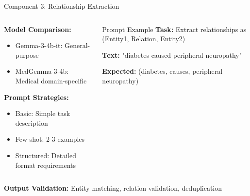 \documentclass[aspectratio=169, 11pt]{beamer}
\begin{document}
\begin{frame}{Component 3: Relationship Extraction}
    \begin{columns}
        \begin{column}{0.5\textwidth}
            \textbf{Model Comparison:}
            \begin{itemize}
                \item \textcolor{ulblue}{Gemma-3-4b-it}: General-purpose
                \item \textcolor{ulgreen}{MedGemma-3-4b}: Medical domain-specific
            \end{itemize}
            
            \textbf{Prompt Strategies:}
            \begin{itemize}
                \item Basic: Simple task description
                \item Few-shot: 2-3 examples
                \item Structured: Detailed format requirements
            \end{itemize}
        \end{column}
        \begin{column}{0.5\textwidth}
            \begin{exampleblock}{Prompt Example}
                \footnotesize
                \textbf{Task:} Extract relationships as (Entity1, Relation, Entity2)
                
                \textbf{Text:} "diabetes caused peripheral neuropathy"
                
                \textbf{Expected:} (diabetes, causes, peripheral neuropathy)
            \end{exampleblock}
        \end{column}
    \end{columns}
    
    \vspace{0.5cm}
    \textbf{Output Validation:} Entity matching, relation validation, deduplication
\end{frame}
\end{document}
